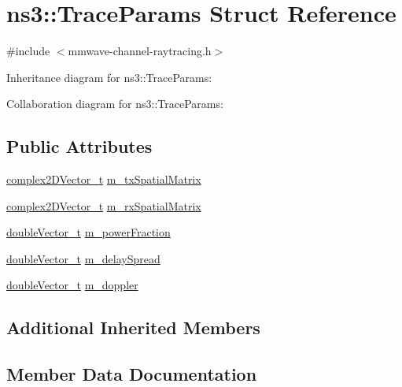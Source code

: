 \hypertarget{structns3_1_1TraceParams}{}\section{ns3\+:\+:Trace\+Params Struct Reference}
\label{structns3_1_1TraceParams}


{\ttfamily \#include $<$mmwave-\/channel-\/raytracing.\+h$>$}



Inheritance diagram for ns3\+:\+:Trace\+Params\+:


Collaboration diagram for ns3\+:\+:Trace\+Params\+:
\subsection*{Public Attributes}
\begin{DoxyCompactItemize}
\item 
\hyperlink{namespacens3_aa25e3feece2676fd7470d50d4ba3d1d1}{complex2\+D\+Vector\+\_\+t} \hyperlink{structns3_1_1TraceParams_a13fa4e06994006f3034833a6179f42ea}{m\+\_\+tx\+Spatial\+Matrix}
\item 
\hyperlink{namespacens3_aa25e3feece2676fd7470d50d4ba3d1d1}{complex2\+D\+Vector\+\_\+t} \hyperlink{structns3_1_1TraceParams_af33687c28e386fa031973c27b3483b19}{m\+\_\+rx\+Spatial\+Matrix}
\item 
\hyperlink{namespacens3_aa6f1edf6566ca6afec613bc6e40240ea}{double\+Vector\+\_\+t} \hyperlink{structns3_1_1TraceParams_a648cdeeb3a7a07a2202a581cf7f5e942}{m\+\_\+power\+Fraction}
\item 
\hyperlink{namespacens3_aa6f1edf6566ca6afec613bc6e40240ea}{double\+Vector\+\_\+t} \hyperlink{structns3_1_1TraceParams_a08c86ea004fa7128dca27951ea1d36bf}{m\+\_\+delay\+Spread}
\item 
\hyperlink{namespacens3_aa6f1edf6566ca6afec613bc6e40240ea}{double\+Vector\+\_\+t} \hyperlink{structns3_1_1TraceParams_a157ae1b83e83649e797ef18cb56c2233}{m\+\_\+doppler}
\end{DoxyCompactItemize}
\subsection*{Additional Inherited Members}


\subsection{Member Data Documentation}
